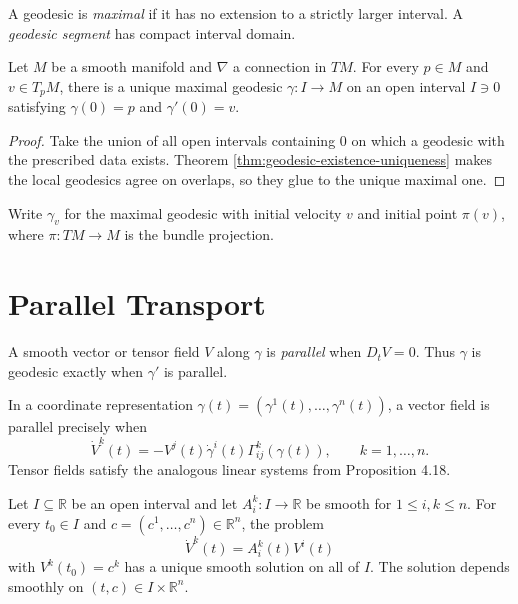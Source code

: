 A geodesic is \emph{maximal} if it has no extension to a strictly larger interval.
A \emph{geodesic segment} has compact interval domain.

\begin{corollary}
\label{cor:existence-of-maximal-geodesic}
Let $M$ be a smooth manifold and $\nabla$ a connection in $TM$. For every
$p\in M$ and $v\in T_pM$, there is a unique maximal geodesic
$\gamma\colon I\to M$ on an open interval $I\ni0$ satisfying
$\gamma(0)=p$ and $\gamma'(0)=v$.
\leanok
\end{corollary}

\begin{proof}
\leanok
\sketch Take the union of all open intervals containing $0$ on which a geodesic
with the prescribed data exists. Theorem \ref{thm:geodesic-existence-uniqueness}
makes the local geodesics agree on overlaps, so they glue to the unique maximal
one.
\end{proof}

Write $\gamma_v$ for the maximal geodesic with initial velocity $v$ and initial
point $\pi(v)$, where $\pi\colon TM\to M$ is the bundle projection.

\section{Parallel Transport}

A smooth vector or tensor field $V$ along $\gamma$ is \emph{parallel} when
$D_tV=0$. Thus $\gamma$ is geodesic exactly when $\gamma'$ is parallel.

In a coordinate representation $\gamma(t)=(\gamma^1(t),\ldots,\gamma^n(t))$,
a vector field is parallel precisely when
\begin{equation}
\dot V^k(t)=-V^j(t)\dot\gamma^i(t)\Gamma^k_{ij}(\gamma(t)),
\qquad k=1,\ldots,n. \tag{4.19}
\end{equation}
Tensor fields satisfy the analogous linear systems from Proposition 4.18.

\begin{theorem}
\label{thm:linear-ode-existence-uniqueness}
\leanok
Let $I\subseteq\mathbb R$ be an open interval and let
$A_i^k\colon I\to\mathbb R$ be smooth for $1\leq i,k\leq n$. For every
$t_0\in I$ and $c=(c^1,\ldots,c^n)\in\mathbb R^n$, the problem
\begin{equation}
\dot V^k(t)=A_i^k(t)V^i(t) \tag{4.20}
\end{equation}
with $V^k(t_0)=c^k$ has a unique smooth solution on all of $I$. The solution
depends smoothly on $(t,c)\in I\times\mathbb R^n$.
\end{theorem}

